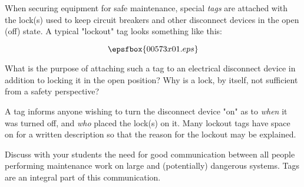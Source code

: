 

When securing equipment for safe maintenance, special {\it tags} are attached with the lock(s) used to keep circuit breakers and other disconnect devices in the open (off) state.  A typical "lockout" tag looks something like this:

$$\epsfbox{00573x01.eps}$$

What is the purpose of attaching such a tag to an electrical disconnect device in addition to locking it in the open position?  Why is a lock, by itself, not sufficient from a safety perspective?







A tag informs anyone wishing to turn the disconnect device "on" as to {\it when} it was turned off, and {\it who} placed the lock(s) on it.  Many lockout tags have space on for a written description so that the reason for the lockout may be explained.







Discuss with your students the need for good communication between all people performing maintenance work on large and (potentially) dangerous systems.  Tags are an integral part of this communication.




